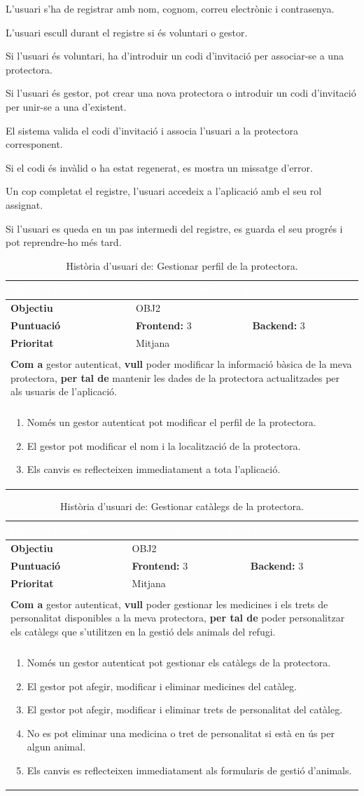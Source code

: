 \documentclass[11pt,a4paper]{report}
\newcommand{\HU}[9]{%
\begin{table}[H]\centering\footnotesize\renewcommand{\arraystretch}{1.1}%
\setlength{\extrarowheight}{0pt}%
\begin{tabular}{|l|p{4.8cm}|p{4.8cm}|}\hline
\rowcolor{oceanblue}\textcolor{white}{\textbf{Història d'Usuari}} & \multicolumn{2}{l|}{\textcolor{white}{#2}} \\\hline
\textbf{Objectiu} & \multicolumn{2}{l|}{#1} \\\hline
\rowcolor{gray!10}\textbf{Puntuació} & \textbf{Frontend: } #3 & \textbf{Backend: } #4 \\\hline
\textbf{Prioritat} & \multicolumn{2}{l|}{#5} \\\hline
\rowcolor{oceanblue}\multicolumn{3}{|l|}{\textcolor{white}{\textbf{Descripció}}} \\\hline
\multicolumn{3}{|p{12.5cm}|}{\textbf{Com a} #6, \textbf{vull} #7, \textbf{per tal de} #8.} \\\hline
\rowcolor{oceanblue}\multicolumn{3}{|l|}{\textcolor{white}{\textbf{Criteris d'Acceptació}}} \\\hline
\multicolumn{3}{|p{12.5cm}|}{\begin{enumerate}[leftmargin=0.4cm,topsep=0pt,parsep=0pt,itemsep=1pt,partopsep=0pt,after=\vspace{-3pt}] #9 \end{enumerate}} \\\hline
\end{tabular}\caption[HU: #2]{Història d'usuari de: #2.}\label{tab:hu_#1}\end{table}%
}
\begin{document}
    {
        \item L'usuari s'ha de registrar amb nom, cognom, correu electrònic i contrasenya.
        \item L'usuari escull durant el registre si és voluntari o gestor.
        \item Si l'usuari és voluntari, ha d'introduir un codi d'invitació per associar-se a una protectora.
        \item Si l'usuari és gestor, pot crear una nova protectora o introduir un codi d'invitació per unir-se a una d'existent.
        \item El sistema valida el codi d'invitació i associa l'usuari a la protectora corresponent.
        \item Si el codi és invàlid o ha estat regenerat, es mostra un missatge d'error.
        \item Un cop completat el registre, l'usuari accedeix a l'aplicació amb el seu rol assignat.
        \item Si l'usuari es queda en un pas intermedi del registre, es guarda el seu progrés i pot reprendre-ho més tard.
    }
    \HU{OBJ2}
    {Gestionar perfil de la protectora}
    {3}
    {3}
    {Mitjana}
    {gestor autenticat}
    {poder modificar la informació bàsica de la meva protectora}
    {mantenir les dades de la protectora actualitzades per als usuaris de l'aplicació}
    {
        \item Només un gestor autenticat pot modificar el perfil de la protectora.
        \item El gestor pot modificar el nom i la localització de la protectora.
        \item Els canvis es reflecteixen immediatament a tota l'aplicació.
    }
    \HU{OBJ2}
    {Gestionar catàlegs de la protectora}
    {3}
    {3}
    {Mitjana}
    {gestor autenticat}
    {poder gestionar les medicines i els trets de personalitat disponibles a la meva protectora}
    {poder personalitzar els catàlegs que s'utilitzen en la gestió dels animals del refugi}
    {
        \item Només un gestor autenticat pot gestionar els catàlegs de la protectora.
        \item El gestor pot afegir, modificar i eliminar medicines del catàleg.
        \item El gestor pot afegir, modificar i eliminar trets de personalitat del catàleg.
        \item No es pot eliminar una medicina o tret de personalitat si està en ús per algun animal.
        \item Els canvis es reflecteixen immediatament als formularis de gestió d'animals.
    }
\end{document}
